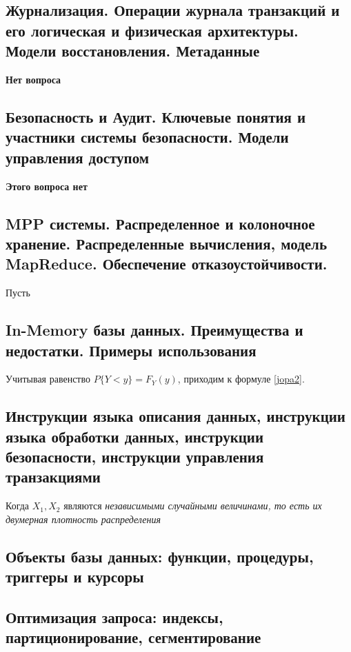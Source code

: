 \subsection{Журнализация. Операции журнала транзакций и его логическая и физическая архитектуры. Модели восстановления. Метаданные}

\textbf{Нет вопроса}

\subsection{Безопасность и Аудит. Ключевые понятия и участники системы безопасности. Модели управления доступом}

\textbf{Этого вопроса нет}


\subsection{MPP системы. Распределенное и колоночное хранение. Распределенные вычисления, модель MapReduce. Обеспечение отказоустойчивости.}

Пусть

\subsection{In-Memory базы данных. Преимущества и недостатки. Примеры использования}

Учитывая равенство $P\{Y < y\} = 	F_Y(y)$, приходим к формуле \ref{jopa2}.

\subsection{Инструкции языка описания данных, инструкции языка обработки данных, инструкции безопасности, инструкции управления транзакциями}

Когда $X_1, X_2$ являются \textit{независимыми случайными величинами, то есть их двумерная плотность распределения}



\subsection{Объекты базы данных: функции, процедуры, триггеры и курсоры}


\subsection{Оптимизация запроса: индексы, партиционирование, сегментирование}

